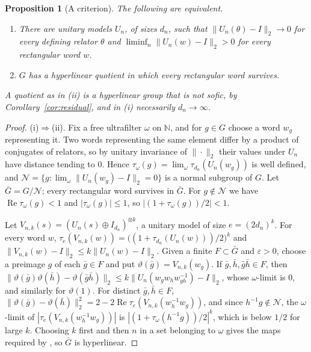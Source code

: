 \documentclass[11pt]{article}
\newtheorem{proposition}[theorem]{Proposition}
\theoremstyle{definition}
\theoremstyle{remark}
\numberwithin{equation}{section}
\newcommand{\N}{\mathbb N}
\newcommand{\eps}{\varepsilon}
\begin{document}
\begin{proposition}[A criterion]\label{prop:criterion}
The following are equivalent.
\begin{enumerate}[label=(\roman*)]
\item There are unitary models $U_n$, of sizes $d_n$, such that $\|U_n(\theta)-I\|_2\to0$ for every defining relator $\theta$ and $\liminf_n\|U_n(w)-I\|_2>0$ for every rectangular word $w$.
\item $G$ has a hyperlinear quotient in which every rectangular word survives.
\end{enumerate}
A quotient as in (ii) is a hyperlinear group that is not sofic, by Corollary~\ref{cor:residual}, and in (i) necessarily $d_n\to\infty$.
\end{proposition}

\begin{proof}
(i)$\Rightarrow$(ii). Fix a free ultrafilter $\omega$ on $\N$, and for $g\in G$ choose a word $w_g$ representing it. Two words representing the same element differ by a product of conjugates of relators, so by unitary invariance of $\|\cdot\|_2$ their values under $U_n$ have distance tending to $0$. Hence $\tau_\omega(g)=\lim_\omega\tau_{d_n}(U_n(w_g))$ is well defined, and $\mathcal N=\{g:\lim_\omega\|U_n(w_g)-I\|_2=0\}$ is a normal subgroup of $G$. Let $\bar G=G/\mathcal N$; every rectangular word survives in $\bar G$. For $g\notin\mathcal N$ we have $\operatorname{Re}\tau_\omega(g)<1$ and $|\tau_\omega(g)|\le1$, so $|(1+\tau_\omega(g))/2|<1$.

Let $V_{n,k}(s)=(U_n(s)\oplus I_{d_n})^{\otimes k}$, a unitary model of size $e=(2d_n)^k$. For every word $w$, $\tau_e(V_{n,k}(w))=\bigl((1+\tau_{d_n}(U_n(w)))/2\bigr)^k$ and $\|V_{n,k}(w)-I\|_2\le k\|U_n(w)-I\|_2$. Given a finite $F\subset\bar G$ and $\eps>0$, choose a preimage $g$ of each $\bar g\in F$ and put $\vartheta(\bar g)=V_{n,k}(w_g)$. If $\bar g,\bar h,\bar g\bar h\in F$, then $\|\vartheta(\bar g)\vartheta(\bar h)-\vartheta(\bar g\bar h)\|_2\le k\|U_n(w_gw_hw_{gh}^{-1})-I\|_2$, whose $\omega$-limit is $0$, and similarly for $\vartheta(1)$. For distinct $\bar g,\bar h\in F$, $\|\vartheta(\bar g)-\vartheta(\bar h)\|_2^2=2-2\operatorname{Re}\tau_e(V_{n,k}(w_h^{-1}w_g))$, and since $h^{-1}g\notin\mathcal N$, the $\omega$-limit of $|\tau_e(V_{n,k}(w_h^{-1}w_g))|$ is $|(1+\tau_\omega(h^{-1}g))/2|^k$, which is below $1/2$ for large $k$. Choosing $k$ first and then $n$ in a set belonging to $\omega$ gives the maps required by \cite[Theorem~3.6]{Pestov2008}, so $\bar G$ is hyperlinear.


\end{proof}
\end{document}
